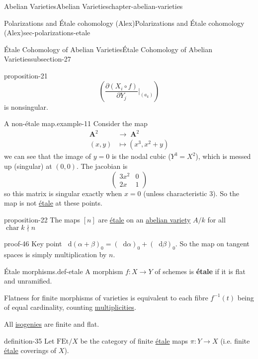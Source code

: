 \documentclass[oneside,10pt,]{book}
\newcommand{\terminology}[1]{\textbf{#1}}
\numberwithin{equation}{section}
\newcommand{\diff}{\mathop{}\!\mathrm{d}}
\newcommand{\lb}{[}
\newcommand{\rb}{]}
\DeclareMathOperator{\characteristic}{char}
\DeclareMathOperator{\aff}{\mathbf{A}}
\newcommand{\amp}{&}
\begin{document}
\begin{chapterptx}{Abelian Varieties}{}{Abelian Varieties}{}{}{chapter-abelian-varieties}
\begin{sectionptx}{Polarizations and Étale cohomology (Alex)}{}{Polarizations and Étale cohomology (Alex)}{}{}{sec-polarizations-etale}
\begin{subsectionptx}{Étale Cohomology of Abelian Varieties}{}{Étale Cohomology of Abelian Varieties}{}{}{subsection-27}
\begin{proposition}{}{}{proposition-21}
\begin{equation*}
\left(\frac{\partial(X_i \circ f)}{\partial Y_j}|_{(a_k)} \right)
\end{equation*}
is nonsingular.%
\end{proposition}
\begin{example}{A non-étale map.}{example-11}%
\hypertarget{p-273}{}%
Consider the map%
\begin{align*}
\aff^2 \amp\to \aff^2\\
(x,y) \amp\mapsto (x^3, x^2 + y)
\end{align*}
we can see that the image of \(y= 0\) is the nodal cubic (\(Y^3 = X^2\)), which is messed up (singular) at \((0,0)\). The jacobian is%
\begin{equation*}
\begin{pmatrix} 3x^2 \amp 0 \\ 2x \amp 1\end{pmatrix}
\end{equation*}
so this matrix is singular exactly when \(x= 0\) (unless characteristic 3). So the map is not \hyperref[def-etale]{étale} at these points.%
\end{example}
\begin{proposition}{}{}{proposition-22}%
\hypertarget{p-274}{}%
The maps \(\lb n\rb\) are \hyperref[def-etale]{étale} on an \hyperref[def-buntes-abvar]{abelian variety} \(A/k\) for all  \(\characteristic{k} \nmid n\)%
\end{proposition}
\begin{proofptx}{}{proof-46}
\hypertarget{p-275}{}%
Key point \(\diff (\alpha+ \beta)_0 = (\diff \alpha )_0 + (\diff \beta)_0\). So the map on tangent spaces is simply multiplication by \(n\).%
\end{proofptx}
\begin{definition}{Étale morphisms.}{def-etale}%
\hypertarget{p-276}{}%
A morphism \(f\colon X\to Y\) of schemes is \terminology{étale} if it is flat and unramified.%
\par
\hypertarget{p-277}{}%
Flatness for finite morphisms of varieties is equivalent to each fibre \(f^{-1}(t)\) being of equal cardinality, counting \hyperref[def-riem-order-vanish]{multiplicities}.%
\end{definition}
\hypertarget{p-278}{}%
All \hyperref[def-supersing-isog-isog]{isogenies} are finite and flat.%
\begin{definition}{}{definition-35}%
\hypertarget{p-279}{}%
Let \(\mathrm{FEt}/X\) be the category of finite \hyperref[def-etale]{étale} maps \(\pi\colon Y \to X\) (i.e. finite \hyperref[def-etale]{étale} coverings of \(X\)).%

\end{definition}
\end{subsectionptx}
\end{sectionptx}
\end{chapterptx}
\end{document}
